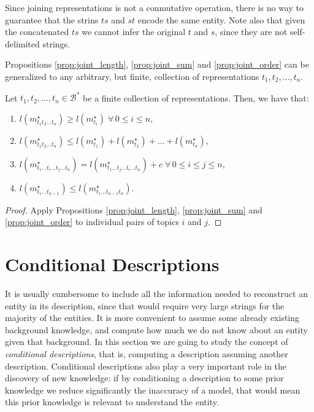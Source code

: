 Since joining representations is not a conmutative operation, there is no way to guarantee that the strins $ts$ and $st$ encode the same entity. Note also that given the concatenated $ts$ we cannot infer the original $t$ and $s$, since they are not self-delimited strings.

Propositions \ref{prop:joint_length}, \ref{prop:joint_sum} and \ref{prop:joint_order} can be generalized to any arbitrary, but finite, collection of representations $t_1, t_2, \ldots, t_n$.

\begin{proposition}
\label{prop:joint_multiple_topics}
Let $t_1, t_2, \ldots, t_n \in \mathcal{B}^\ast$ be a finite collection of representations. Then, we have that:

\renewcommand{\theenumi}{\roman{enumi}}
\begin{enumerate}
\item $l(m_{t_1 t_2 \ldots t_n}^\star) \geq l(m_ {t_i}^\star) \; \forall \, 0 \leq i \leq n$,
\item $l(m_{t_1 t_2 \ldots t_n}^\star) \leq l(m_ {t_1}^\star) + l(m_ {t_2}^\star) + \ldots + l(m_ {t_n}^\star)$,
\item $l(m_{t_1 \ldots t_i \ldots t_j \ldots t_n}^\star) = l(m_{t_1 \ldots t_j \ldots t_i \ldots t_n}^\star) + c \; \forall \, 0 \leq i \leq j \leq n$,
\item $l(m_{t_1 \ldots t_{n-1}}^\star) \leq l(m_{t_1 \ldots t_{n-1} t_n}^\star)$.
\end{enumerate}
\end{proposition}
\begin{proof}
Apply Propositions \ref{prop:joint_length}, \ref{prop:joint_sum} and \ref{prop:joint_order} to individual pairs of topics $i$ and $j$.
\end{proof}

%
%

\section{Conditional Descriptions}

It is usually cumbersome to include all the information needed to reconstruct an entity in its description, since that would require very large strings for the majority of the entities. It is more convenient to assume some already existing background knowledge, and compute how much we do not know about an entity given that background. In this section we are going to study the concept of \emph{conditional descriptions}, that is, computing a description assuming another description. Conditional descriptions also play a very important role in the discovery of new knowledge: if by conditioning a description to some prior knowledge we reduce significantly the inaccuracy of a model, that would mean this prior knowledge is relevant to understand the entity.

